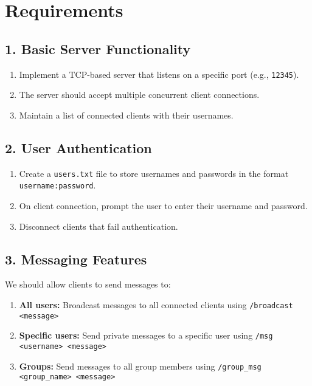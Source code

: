 \documentclass[12pt,a4paper]{article}
\begin{document}
\section*{Requirements}

\subsection*{1. Basic Server Functionality}

\begin{enumerate}
 \item Implement a TCP-based server that listens on a specific port (e.g., \texttt{12345}).
 \item  The server should accept multiple concurrent client connections.
 \item  Maintain a list of connected clients with their usernames.
\end{enumerate}


\subsection*{2. User Authentication}
\begin{enumerate}
 \item  Create a \texttt{users.txt} file to store usernames and passwords in the format \texttt{username:password}.
 \item  On client connection, prompt the user to enter their username and password.
 \item  Disconnect clients that fail authentication.
 \end{enumerate}

\subsection*{3. Messaging Features}
We should allow clients to send messages to:
    \begin{enumerate}
        \item \textbf{All users:} Broadcast messages to all connected clients using \texttt{/broadcast <message>} 
        \item \textbf{Specific users:} Send private messages to a specific user using \texttt{/msg <username> <message>}
        \item \textbf{Groups:} Send messages to all group members using \texttt{/group\_msg <group\_name> <message>}
    \end{enumerate}
\end{document}
